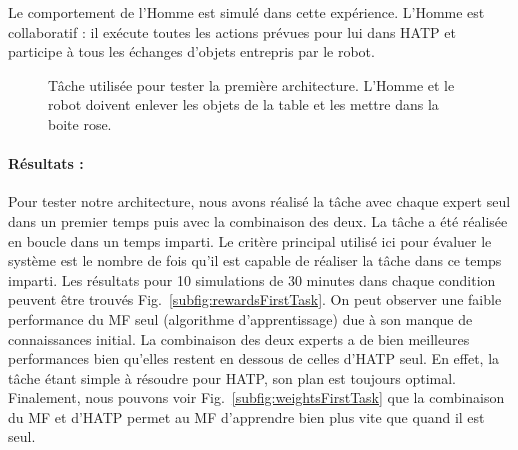 \documentclass[english,a4paper,11pt,twoside]{StyleThese}
\begin{document}
Le comportement de l'Homme est simulé dans cette expérience. L'Homme est collaboratif : il exécute toutes les actions prévues pour lui dans HATP et participe à tous les échanges d'objets entrepris par le robot.

\begin{figure}[!h]
\centering
	\hfill
    \caption{Tâche utilisée pour tester la première architecture. L'Homme et le robot doivent enlever les objets de la table et les mettre dans la boite rose.}
    \label{fig:firstTask}
\end{figure}


\paragraph{Résultats :}

Pour tester notre architecture, nous avons réalisé la tâche avec chaque expert seul dans un premier temps puis avec la combinaison des deux. La tâche a été réalisée en boucle dans un temps imparti. Le critère principal utilisé ici pour évaluer le système est le nombre de fois qu'il est capable de réaliser la tâche dans ce temps imparti. Les résultats pour 10 simulations de 30 minutes dans chaque condition peuvent être trouvés Fig.~\ref{subfig:rewardsFirstTask}. On peut observer une faible performance du MF seul (algorithme d'apprentissage) due à son manque de connaissances initial. La combinaison des deux experts a de bien meilleures performances bien qu'elles restent en dessous de celles d'HATP seul. En effet, la tâche étant simple à résoudre pour HATP, son plan est toujours optimal. Finalement, nous pouvons voir Fig.~\ref{subfig:weightsFirstTask} que la combinaison du MF et d'HATP permet au MF d'apprendre bien plus vite que quand il est seul.
\end{document}
